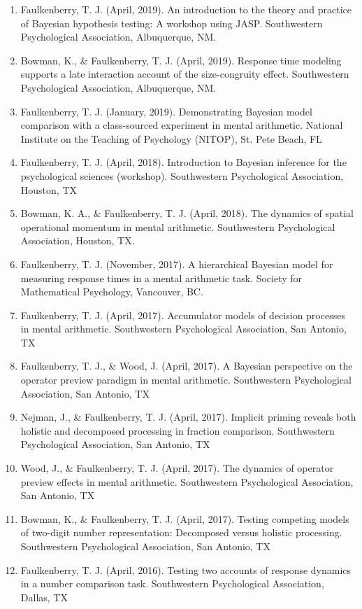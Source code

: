 \documentclass[article,10pt]{article}
\begin{document}
\begin{enumerate}
\item Faulkenberry, T. J. (April, 2019). An introduction to the theory and practice of Bayesian hypothesis testing: A workshop using JASP. Southwestern Psychological Association, Albuquerque, NM.
\item Bowman, K., \& Faulkenberry, T. J. (April, 2019). Response time modeling supports a late interaction account of the size-congruity effect. Southwestern Psychological Association, Albuquerque, NM.
\item Faulkenberry, T. J. (January, 2019). Demonstrating Bayesian model comparison with a class-sourced experiment in mental arithmetic. National Institute on the Teaching of Psychology (NITOP), St. Pete Beach, FL
\item Faulkenberry, T. J. (April, 2018). Introduction to Bayesian inference for the psychological sciences (workshop). Southwestern Psychological Association, Houston, TX
\item Bowman, K. A., \& Faulkenberry, T. J. (April, 2018). The dynamics of spatial operational momentum in mental arithmetic. Southwestern Psychological Association, Houston, TX.
\item Faulkenberry, T. J. (November, 2017). A hierarchical Bayesian model for measuring response times in a mental arithmetic task. Society for Mathematical Psychology, Vancouver, BC.
\item Faulkenberry, T. J. (April, 2017). Accumulator models of decision processes in mental arithmetic. Southwestern Psychological Association, San Antonio, TX
\item Faulkenberry, T. J., \& Wood, J. (April, 2017). A Bayesian perspective on the operator preview paradigm in mental arithmetic. Southwestern Psychological Association, San Antonio, TX
\item Nejman, J., \& Faulkenberry, T. J. (April, 2017). Implicit priming reveals both holistic and decomposed processing in fraction comparison. Southwestern Psychological Association, San Antonio, TX
\item Wood, J., \& Faulkenberry, T. J. (April, 2017). The dynamics of operator preview effects in mental arithmetic. Southwestern Psychological Association, San Antonio, TX
\item Bowman, K., \& Faulkenberry, T. J. (April, 2017). Testing competing models of two-digit number representation: Decomposed versus holistic processing. Southwestern Psychological Association, San Antonio, TX
\item Faulkenberry, T. J. (April, 2016). Testing two accounts of response dynamics in a number comparison task. Southwestern Psychological Association, Dallas, TX

\end{enumerate}
\end{document}

